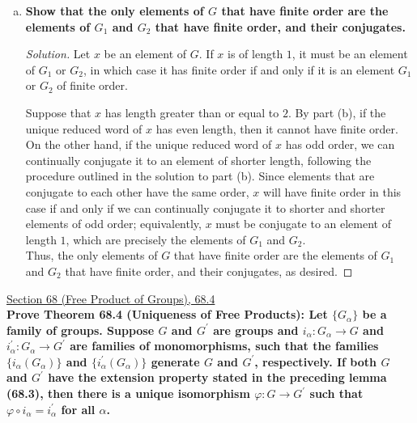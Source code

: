 \documentclass[11pt]{article}
\newenvironment{solution}
  {\renewcommand\qedsymbol{$\blacksquare$}\begin{proof}[Solution]}
  {\end{proof}}
\begin{document}
\begin{enumerate}[a)]
    \item \textbf{Show that the only elements of $G$ that have finite order are the elements of $G_1$ and $G_2$ that have finite order, and their conjugates.}

    \begin{solution}
    Let $x$ be an element of $G$. If $x$ is of length $1$, it must be an element of $G_1$ or $G_2$, 
    in which case it has finite order if and only if it is an element $G_1$ or $G_2$ of finite order. 
    
    Suppose that $x$ has length greater than or equal to $2$. By part (b), if the unique reduced word of $x$ has even length, then it cannot have finite order. 
    On the other hand, if the unique reduced word of $x$ has odd order, we can continually conjugate it to an element of shorter length, following the procedure outlined in the solution to part (b). Since elements that are conjugate to each other have the same order,
    $x$ will have finite order in this case if and only if we can continually conjugate it to shorter and shorter elements of odd order; equivalently, $x$ must be conjugate to an element of length $1$, which are precisely the elements of $G_1$ and $G_2$. \\

    Thus, the only elements of $G$ that have finite order are the elements of $G_1$ and $G_2$ that have finite order, and their conjugates, as desired. \end{solution}
\end{enumerate}
\newpage

\underline{Section 68 (Free Product of Groups), 68.4} \\

\textbf{Prove Theorem 68.4 (Uniqueness of Free Products): Let $\{G_\alpha\}$ be a family of groups. Suppose $G$ and $G^{\prime}$ are groups
and $i_\alpha\colon G_\alpha \rightarrow G$ and $i^{\prime}_\alpha \colon G_\alpha \rightarrow G^{\prime}$ are families of monomorphisms, such that the families $\{ i_\alpha(G_\alpha) \}$ and $\{ i^{\prime}_\alpha(G_\alpha) \}$ generate $G$ and $G^{\prime}$, respectively.
If both $G$ and $G^{\prime}$ have the extension property stated in the preceding lemma (68.3), then there is a unique isomorphism $\varphi\colon G \rightarrow G^{\prime}$ such that $\varphi \circ i_\alpha = i^{\prime}_\alpha$ for all $\alpha$.}
\end{document}
